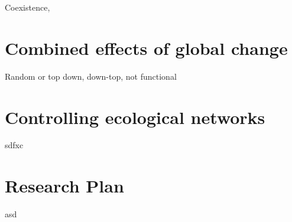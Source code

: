 \documentclass[a4paper]{article}
\begin{document}
Coexistence,

\chapter*{Combined effects of global change}

Random or top down, down-top, not functional

\chapter*{Controlling ecological networks}

sdfxc

\chapter*{Research Plan}

asd

\footnotesize
\twocolumn

\end{document}
